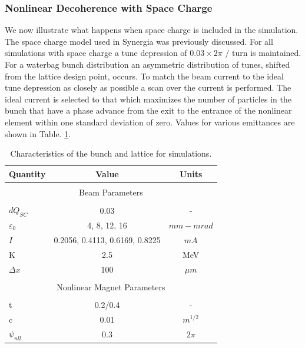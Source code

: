 \documentclass[aps,prstab,twocolumn, groupedaddress]{revtex4-1}
\begin{document}
\subsubsection{Nonlinear Decoherence with Space Charge}

We now illustrate what happens when space charge is included in the simulation. The 
space charge model used in Synergia was previously discussed. For all simulations with 
space charge a tune depression of $0.03 \times 2\pi$ $/$ turn is maintained. For a 
waterbag bunch distribution an asymmetric distribution of tunes, shifted from the lattice 
design point, occurs. To match the beam current to the ideal tune depression as closely 
as possible a scan over the current is performed. The ideal current is selected to that 
which maximizes the number of particles in the bunch that have a phase advance from the 
exit to the entrance of the nonlinear element within one standard deviation of zero. Values 
for various emittances are shown in Table. \ref{table:sc_params}.

\begin{table}
	\caption{\label{table:sc_params} Characteristics of the bunch and lattice for 
	simulations.}
	\begin{ruledtabular}
	\begin{tabular}{l|cc}
		\hline
		Quantity & Value & Units \\
		\hline
		\multicolumn{3}{c}{} \\[-1em]
		\multicolumn{3}{c}{Beam Parameters} \\
		\hline
		\\[-1em]
		$dQ_{SC}$ & 0.03 & - \\
		$\varepsilon_0$ & 4, 8, 12, 16& $mm-mrad$ \\
		$I$ &0.2056, 0.4113, 0.6169,  0.8225 & $mA$ \\
		K    &  2.5  & MeV \\
		$\Delta x$& 100 & $\mu m$ \\
		\hline
		\multicolumn{3}{c}{} \\[-1em]
		\multicolumn{3}{c}{Nonlinear Magnet Parameters} \\
		\hline
		\\[-1em]
		t & 0.2/0.4 & - \\
		c & 0.01 & $m^{1/2}$ \\
		$\psi_{nll}$& 0.3 & $2\pi$ \\
		\hline
	\end{tabular}
	\end{ruledtabular}
\end{table}	
\end{document}
